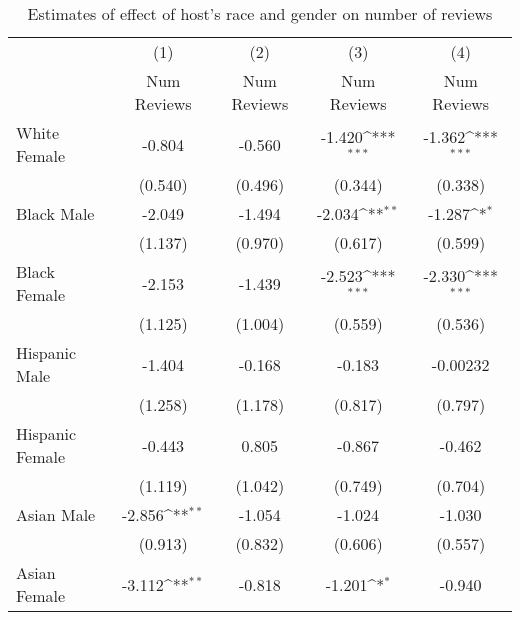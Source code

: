 {
\def\sym#1{\ifmmode^{#1}\else\(^{#1}\)\fi}
\begin{longtable}{l*{4}{c}}
\caption{Estimates of effect of host's race and gender on number of reviews} \label{table:numreviews}\\
\hline\hline\endfirsthead\hline\endhead\hline\endfoot\endlastfoot
                    &\multicolumn{1}{c}{(1)}&\multicolumn{1}{c}{(2)}&\multicolumn{1}{c}{(3)}&\multicolumn{1}{c}{(4)}\\
                    &\multicolumn{1}{c}{Num Reviews}&\multicolumn{1}{c}{Num Reviews}&\multicolumn{1}{c}{Num Reviews}&\multicolumn{1}{c}{Num Reviews}\\
\hline
White Female        &      -0.804         &      -0.560         &      -1.420\sym{***}&      -1.362\sym{***}\\
                    &     (0.540)         &     (0.496)         &     (0.344)         &     (0.338)         \\
[1em]
Black Male          &      -2.049         &      -1.494         &      -2.034\sym{**} &      -1.287\sym{*}  \\
                    &     (1.137)         &     (0.970)         &     (0.617)         &     (0.599)         \\
[1em]
Black Female        &      -2.153         &      -1.439         &      -2.523\sym{***}&      -2.330\sym{***}\\
                    &     (1.125)         &     (1.004)         &     (0.559)         &     (0.536)         \\
[1em]
Hispanic Male       &      -1.404         &      -0.168         &      -0.183         &    -0.00232         \\
                    &     (1.258)         &     (1.178)         &     (0.817)         &     (0.797)         \\
[1em]
Hispanic Female     &      -0.443         &       0.805         &      -0.867         &      -0.462         \\
                    &     (1.119)         &     (1.042)         &     (0.749)         &     (0.704)         \\
[1em]
Asian Male          &      -2.856\sym{**} &      -1.054         &      -1.024         &      -1.030         \\
                    &     (0.913)         &     (0.832)         &     (0.606)         &     (0.557)         \\
[1em]
Asian Female        &      -3.112\sym{**} &      -0.818         &      -1.201\sym{*}  &      -0.940         \\

\end{longtable}}

